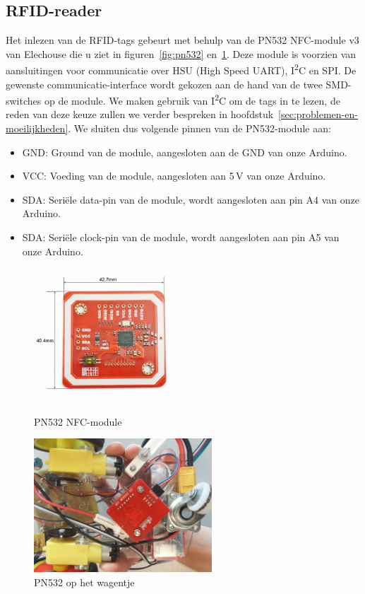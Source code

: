 \subsection{RFID-reader}
Het inlezen van de RFID-tags gebeurt met behulp van de PN532 NFC-module v3 van Elechouse die u ziet in figuren~\ref{fig:pn532} en~\ref{fig:rfidlezermontage}. Deze module is voorzien van aansluitingen voor communicatie over HSU (High Speed UART), I\textsuperscript{2}C en SPI. De gewenste communicatie-interface wordt gekozen aan de hand van de twee SMD-switches op de module. We maken gebruik van I\textsuperscript{2}C om de tags in te lezen, de reden van deze keuze zullen we verder bespreken in hoofdstuk~\vref{sec:problemen-en-moeilijkheden}. We sluiten dus volgende pinnen van de PN532-module aan:
\begin{itemize}
	\item GND: Ground van de module, aangesloten aan de GND van onze Arduino.
	\item VCC: Voeding van de module, aangesloten aan 5\,V van onze Arduino.
	\item SDA: Seri\"ele data-pin van de module, wordt aangesloten aan pin A4 van onze Arduino.
	\item SDA: Seri\"ele clock-pin van de module, wordt aangesloten aan pin A5 van onze Arduino.
\end{itemize}

\begin{figure}[H]
	\centering
	\begin{minipage}[b]{0.4\textwidth}
		\centering
		\includegraphics[height=5cm]{rfidlezer.png}
		\caption{PN532 NFC-module\label{fig:pn532}}
	\end{minipage}
	\hfill
	\begin{minipage}[b]{0.4\textwidth}
		\centering
		\includegraphics[height=5cm]{rfidlezermontage.png}
		\caption{PN532 op het wagentje\label{fig:rfidlezermontage}}
	\end{minipage}
\end{figure}
